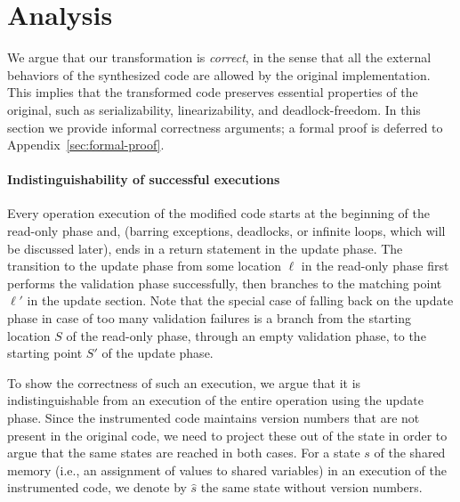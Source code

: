 \newcommand{\op}{\emph{\textsc{op}}}
\newcommand{\opt}{\textsc{opt}}

\section{Analysis}
\label{sec:proof}


We argue that our transformation is \emph{correct}, in the sense that all the external behaviors of 
the synthesized code are allowed by the original implementation.
This implies that the transformed code preserves essential properties of the original, such as serializability,
linearizability, and deadlock-freedom.
In this section we provide informal correctness arguments; a formal proof is deferred to Appendix~\ref{sec:formal-proof}.

\paragraph{Indistinguishability of successful executions}
Every operation execution of the modified code starts at the beginning of the read-only phase and, 
(barring exceptions, deadlocks, or infinite loops, which will be discussed later), 
ends in a return statement in the update phase. The transition to the update phase 
from some location $\ell$ in the read-only phase first performs the validation phase successfully, then branches
to the matching point $\ell'$ in the update section. Note that the special case of falling back on the update phase in case of too
many validation failures is a branch from the starting location $S$ of the read-only phase, 
through an empty validation phase, to the starting point $S'$ of the update phase.

To show the correctness of such an execution, we argue that it is indistinguishable from an execution of the entire
operation using the  update phase. Since the instrumented code maintains version numbers that are not present in
the original code, we need to project these out of the state in order to argue that the same states are reached in
both cases. For a state $s$ of the shared memory (i.e., an assignment of values to shared variables) in an execution
of the instrumented code, we denote by $\hat{s}$ the same state without version numbers.

